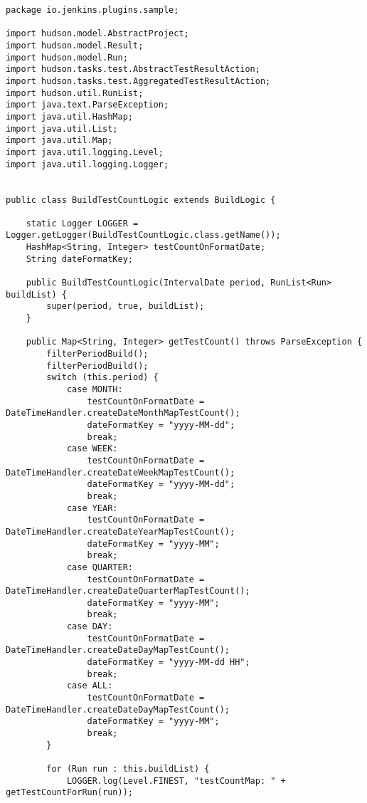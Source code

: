 \begin{lstlisting}
package io.jenkins.plugins.sample;

import hudson.model.AbstractProject;
import hudson.model.Result;
import hudson.model.Run;
import hudson.tasks.test.AbstractTestResultAction;
import hudson.tasks.test.AggregatedTestResultAction;
import hudson.util.RunList;
import java.text.ParseException;
import java.util.HashMap;
import java.util.List;
import java.util.Map;
import java.util.logging.Level;
import java.util.logging.Logger;


public class BuildTestCountLogic extends BuildLogic {

    static Logger LOGGER = Logger.getLogger(BuildTestCountLogic.class.getName());
    HashMap<String, Integer> testCountOnFormatDate;
    String dateFormatKey;

    public BuildTestCountLogic(IntervalDate period, RunList<Run> buildList) {
        super(period, true, buildList);
    }

    public Map<String, Integer> getTestCount() throws ParseException {
        filterPeriodBuild();
        filterPeriodBuild();
        switch (this.period) {
            case MONTH:
                testCountOnFormatDate = DateTimeHandler.createDateMonthMapTestCount();
                dateFormatKey = "yyyy-MM-dd";
                break;
            case WEEK:
                testCountOnFormatDate = DateTimeHandler.createDateWeekMapTestCount();
                dateFormatKey = "yyyy-MM-dd";
                break;
            case YEAR:
                testCountOnFormatDate = DateTimeHandler.createDateYearMapTestCount();
                dateFormatKey = "yyyy-MM";
                break;
            case QUARTER:
                testCountOnFormatDate = DateTimeHandler.createDateQuarterMapTestCount();
                dateFormatKey = "yyyy-MM";
                break;
            case DAY:
                testCountOnFormatDate = DateTimeHandler.createDateDayMapTestCount();
                dateFormatKey = "yyyy-MM-dd HH";
                break;
            case ALL:
                testCountOnFormatDate = DateTimeHandler.createDateDayMapTestCount();
                dateFormatKey = "yyyy-MM";
                break;
        }

        for (Run run : this.buildList) {
            LOGGER.log(Level.FINEST, "testCountMap: " + getTestCountForRun(run));


\end{lstlisting}
